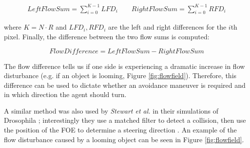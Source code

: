 \documentclass[a4paper,11pt,twoside,openright]{article}
\begin{document}
\begin{align}
  LeftFlowSum = \sum_{i = 0}^{K - 1} LFD_i \qquad
  RightFlowSum = \sum_{i = 0}^{K - 1} RFD_i
\end{align}

where $K = N \cdot R$ and $LFD_i, RFD_i$ are the left and right
differences for the $i$th pixel. Finally, the difference between the
two flow sums is computed:

\begin{equation}
  FlowDifference = LeftFlowSum - RightFlowSum
\end{equation}

The flow difference tells us if one side is experiencing a dramatic
increase in flow disturbance (e.g. if an object is looming, Figure
\ref{fig:flowfield}). Therefore, this difference can be used to
dictate whether an avoidance maneuver is required and in which
direction the agent should turn.
\newline\par



A similar method was also used by \textit{Stewart et al.} in their
simulations of Drosophila \cite{Stewart2010}; interestingly they use
a matched filter to detect a collision, then use the position of the
FOE to determine a steering direction \cite{Stewart2010}. An example
of the flow disturbance caused by a looming object can be seen in
Figure \ref{fig:flowfield}.
\newline\par
\end{document}
